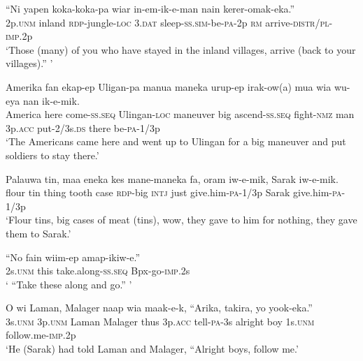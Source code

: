 \ea
\gll  “Ni  yapen  koka-koka-pa  wiar  in-em-ik-e-man          nain  kerer-omak-eka.” \\
2p.\textsc{unm}  inland  \textsc{rdp}-jungle-\textsc{loc}  3.\textsc{dat}  sleep-\textsc{ss}.\textsc{sim}-be-\textsc{pa}-2p  \textsc{rm}  arrive-\textsc{distr}/\textsc{pl}-\textsc{imp}.2p \\


\glt ‘Those (many) of you who have stayed in the inland villages, arrive (back to your villages).” ’ \\
\z


\ea
\gll  Amerika  fan  ekap-ep  Uligan-pa  manua  maneka   urup-ep  irak-ow(a)  mua  wia  wu-eya  nan                   ik-e-mik. \\
America  here  come-\textsc{ss.seq}  Ulingan-\textsc{loc}  maneuver  big  ascend-\textsc{ss.seq}  fight-\textsc{nmz}  man  3p.\textsc{acc}  put-2/3s.\textsc{ds}  there    be-\textsc{pa}-1/3p \\




\glt ‘The Americans came here and went up to Ulingan for a big maneuver and put soldiers to stay there.’ \\
\z


\ea
\gll  Palauwa  tin,  maa  eneka  kes  mane-maneka  fa,     oram  iw-e-mik,  Sarak  iw-e-mik. \\
flour  tin  thing  tooth  case  \textsc{rdp}-big  \textsc{intj}              just  give.him-\textsc{pa}-1/3p  Sarak  give.him-\textsc{pa}-1/3p \\


\glt ‘Flour tins, big cases of meat (tins), wow, they gave to him for nothing, they gave them to Sarak.’ \\
\z


\ea
\gll  “No  fain  wiim-ep  amap-ikiw-e.” \\
2s.\textsc{unm}  this  take.along-\textsc{ss.seq}  Bpx-go-\textsc{imp}.2s \\
\glt ‘ “Take these along and go.” ’ \\
\z


\ea
\gll  O  wi  Laman,  Malager  naap  wia  maak-e-k,        “Arika,  takira,  yo  yook-eka.” \\
3s.\textsc{unm}  3p.\textsc{unm}  Laman  Malager  thus  3p.\textsc{acc}  tell-\textsc{pa}-3s  alright  boy  1s.\textsc{unm}  follow.me-\textsc{imp}.2p \\


\glt ‘He (Sarak) had told Laman and Malager, “Alright boys, follow me.’ \\
\z


